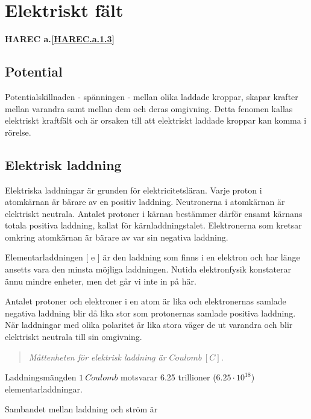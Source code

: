 \section{Elektriskt fält}
\textbf{HAREC a.\ref{HAREC.a.1.3}\label{myHAREC.a.1.3}}
\label{elektriskafält}

\subsection{Potential}

Potentialskillnaden - spänningen - mellan olika laddade kroppar, skapar krafter
mellan varandra samt mellan dem och deras omgivning. Detta fenomen kallas
elektriskt kraftfält och är orsaken till att elektriskt laddade kroppar kan
komma i rörelse.

\subsection{Elektrisk laddning}

Elektriska laddningar är grunden för elektricitetsläran. Varje proton i
atomkärnan är bärare av en positiv laddning. Neutronerna i atomkärnan är
elektriskt neutrala. Antalet protoner i kärnan bestämmer därför ensamt kärnans
totala positiva laddning, kallat för kärnladdningstalet. Elektronerna som
kretsar omkring atomkärnan är bärare av var sin negativa laddning.

Elementarladdningen [ e ] är den laddning som finns i en elektron och har länge
ansetts vara den minsta möjliga laddningen. Nutida elektronfysik konstaterar
ännu mindre enheter, men det går vi inte in på här.

Antalet protoner och elektroner i en atom är lika och elektronernas samlade
negativa laddning blir då lika stor som protonernas samlade positiva laddning.
När laddningar med olika polaritet är lika stora väger de ut varandra och blir
elektriskt neutrala till sin omgivning.

\begin{quote}\emph{
Måttenheten för elektrisk laddning är \(Coulomb\ [C]\).
}\end{quote}

Laddningsmängden \(1\ Coulomb\) motsvarar 6.25 trillioner (\(6.25\cdot10^{18}\))
elementarladdningar.

Sambandet mellan laddning och ström är

